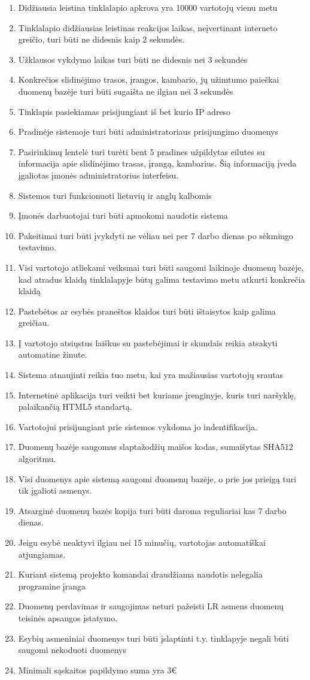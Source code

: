 \documentclass[oneside]{VUMIFPSkursinis}
\begin{document}
\begin{enumerate}
	\item Didžiausia leistina tinklalapio apkrova yra 10000 vartotojų vienu metu
	\item Tinklalapio didžiausias leistinas reakcijos laikas, neįvertinant interneto greičio, turi būti ne didesnis kaip 2 sekundės.
	\item Užklausos vykdymo laikas turi būti ne didesnis nei 3 sekundės
	\item Konkrečios slidinėjimo trasos, įrangos, kambario, jų užimtumo paieškai duomenų bazėje turi būti sugaišta ne ilgiau nei 3 sekundės
	\item Tinklapis pasiekiamas prisijungiant iš bet kurio IP adreso
	\item Pradinėje sistemoje turi būti administratoriaus prisijungimo duomenys
	\item Pasirinkimų lentelė turi turėti bent 5 pradines užpildytas eilutes su informacija apie slidinėjimo trasas, įrangą, kambarius. Šią informaciją įveda įgaliotas įmonės administratorius interfeisu.
	\item Sistemos turi funkcionuoti lietuvių ir anglų kalbomis
	\item Įmonės darbuotojai turi būti apmokomi naudotis sistema
	\item Pakeitimai turi būti įvykdyti ne vėliau nei per 7 darbo dienas po sėkmingo testavimo.
	\item Visi vartotojo atliekami veiksmai turi būti saugomi laikinoje duomenų bazėje, kad atradus klaidą tinklalapyje būtų galima testavimo metu atkurti konkrečia klaidą
	\item Pastebėtos ar esybės praneštos klaidos turi būti ištaisytos kaip galima greičiau.
	\item Į vartotojo atsiųstus laiškus su pastebėjimai ir skundais reikia atsakyti automatine žinute.
	\item Sistema atnaujinti reikia tuo metu, kai yra mažiausias vartotojų srautas
	\item Internetinė aplikacija turi veikti bet kuriame įrenginyje, kuris turi naršyklę, palaikančią HTML5 standartą.
	\item Vartotojui prisijungiant prie sistemos vykdoma jo indentifikacija.
	\item Duomenų bazėje saugomas slaptažodžių maišos kodas, sumaišytas SHA512 algoritmu.
	\item Visi duomenys apie sistemą saugomi duomenų bazėje, o prie jos prieigą turi tik įgalioti asmenys.
	\item Atsarginė duomenų bazės kopija turi būti daroma reguliariai kas 7 darbo dienas.
	\item Jeigu esybė neaktyvi ilgiau nei 15 minučių, vartotojas automatiškai atjungiamas.
	\item Kuriant sistemą projekto komandai draudžiama naudotis nelegalia programine įranga
	\item Duomenų perdavimas ir saugojimas neturi pažeisti LR asmens duomenų teisinės apsaugos įstatymo.
	\item Esybių asmeniniai duomenys turi būti įslaptinti t.y. tinklapyje negali būti saugomi nekoduoti duomenys
	\item Minimali sąskaitos papildymo suma yra 3€


\end{enumerate}
\end{document}
